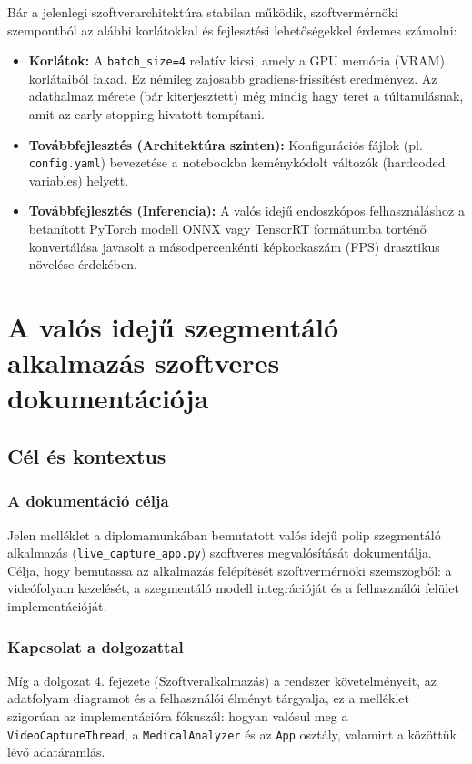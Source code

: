 \documentclass[12pt, a4paper]{report}
\begin{document}
Bár a jelenlegi szoftverarchitektúra stabilan működik, szoftvermérnöki szempontból az alábbi korlátokkal és fejlesztési lehetőségekkel érdemes számolni:
\begin{itemize}
    \item \textbf{Korlátok:} A \texttt{batch\_size=4} relatív kicsi, amely a GPU memória (VRAM) korlátaiból fakad. Ez némileg zajosabb gradiens-frissítést eredményez. Az adathalmaz mérete (bár kiterjesztett) még mindig hagy teret a túltanulásnak, amit az early stopping hivatott tompítani.
    \item \textbf{Továbbfejlesztés (Architektúra szinten):} Konfigurációs fájlok (pl. \texttt{config.yaml}) bevezetése a notebookba keménykódolt változók (hardcoded variables) helyett.
    \item \textbf{Továbbfejlesztés (Inferencia):} A valós idejű endoszkópos felhasználáshoz a betanított PyTorch modell ONNX vagy TensorRT formátumba történő konvertálása javasolt a másodpercenkénti képkockaszám (FPS) drasztikus növelése érdekében.
\end{itemize}

\chapter{A valós idejű szegmentáló alkalmazás szoftveres dokumentációja}

\section{Cél és kontextus}

\subsection{A dokumentáció célja}
Jelen melléklet a diplomamunkában bemutatott valós idejű polip szegmentáló alkalmazás (\texttt{live\_capture\_app.py}) szoftveres megvalósítását dokumentálja. Célja, hogy bemutassa az alkalmazás felépítését szoftvermérnöki szemszögből: a videófolyam kezelését, a szegmentáló modell integrációját és a felhasználói felület implementációját.

\subsection{Kapcsolat a dolgozattal}
Míg a dolgozat 4. fejezete (Szoftveralkalmazás) a rendszer követelményeit, az adatfolyam diagramot és a felhasználói élményt tárgyalja, ez a melléklet szigorúan az implementációra fókuszál: hogyan valósul meg a \texttt{VideoCaptureThread}, a \texttt{MedicalAnalyzer} és az \texttt{App} osztály, valamint a közöttük lévő adatáramlás.
\end{document}
